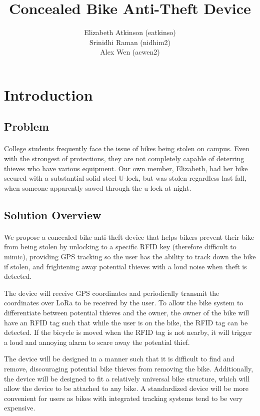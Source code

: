 \documentclass{article}
\title{Concealed Bike Anti-Theft Device}
\author{Elizabeth Atkinson (eatkinso)\\ Srinidhi Raman (nidhim2) \\ Alex Wen (acwen2) }
\begin{document}
\maketitle

\section{Introduction}
\subsection{Problem}

\paragraph{}
College students frequently face the issue of bikes being stolen on campus. Even with the strongest of protections, they are not completely capable of deterring thieves who have various equipment. Our own member, Elizabeth, had her bike secured with a substantial solid steel U-lock, but was stolen regardless last fall, when someone apparently sawed through the u-lock at night. 

\subsection{Solution Overview}
\paragraph{}
We propose a concealed bike anti-theft device that helps bikers prevent their bike from being stolen by unlocking to a specific RFID key (therefore difficult to mimic), providing GPS tracking so the user has the ability to track down the bike if stolen, and frightening away potential thieves with a loud noise when theft is detected.

The device will receive GPS coordinates and periodically transmit the coordinates over LoRa to be received by the user. To allow the bike system to differentiate between potential thieves and the owner, the owner of the bike will have an RFID tag such that while the user is on the bike, the RFID tag can be detected. If the bicycle is moved when the RFID tag is not nearby, it will trigger a loud and annoying alarm to scare away the potential thief.

The device will be designed in a manner such that it is difficult to find and remove, discouraging potential bike thieves from removing the bike. Additionally, the device will be designed to fit a relatively universal bike structure, which will allow the device to be attached to any bike. A standardized device will be more convenient for users as bikes with integrated tracking systems tend to be very expensive.
\end{document}
